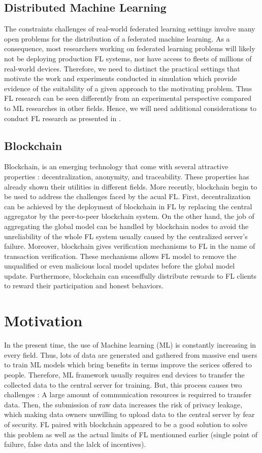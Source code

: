 \documentclass{article}
\begin{document}
\subsection{Distributed Machine Learning}
The constraints challenges of real-world federated learning settings involve many open problems for the distribution of a federated machine learning. As a consequence, most researchers working on federated learning problems will likely not be deploying production FL systems, nor have access to fleets of millions of real-world devices. Therefore, we need to distinct the practical settings that motivate the work and experiments conducted in simulation which provide evidence of the suitability of a given approach to the motivating problem. Thus FL research can be seen differently from an experimental perspective compared to ML researches in other fields. Hence,  we will need additional considerations to conduct FL research as presented in \cite{kairouz_advances_2021}.

\subsection{Blockchain}
Blockchain, is an emerging technology that come with several attractive properties : decentralization, anonymity, and traceability. These properties has already shown their utilities in different fields. More recently, blockchain begin to be used to address the challenges faced by the acual FL. First, decentralization can be achieved by the deployment of blockchain in FL by replacing the central aggregator by the peer-to-peer blockchain system. On the other hand,  the job of aggregating the global model can be handled by blockchain nodes to avoid the unreliability of the whole FL system usually caused by the centralized server's failure. Moreover, blockchain gives verification mechanisms to FL in the name of transaction verification. These mechanisms allows FL model to remove the unqualified or even malicious local model updates before the global model update. Furthermore, blockchain can sucessffully distribute rewards to FL clients to reward their participation and honest behaviors.

\section{Motivation}
In the present time, the use of Machine learning (ML) is constantly increasing in every field. Thus, lots of data are generated and gathered from massive end users to train ML models which bring benefits in terms improve the serices offered to people. Therefore, ML framework usually requires end devices to transfer the collected data to the central server for training. But, this process causes two challenges : A large amount of communication resources is requirred to transfer data. Then, the submission of raw data increases the risk of privacy leakage, which making data owners unwilling to upload data to the central server by fear of security. FL paired with blockchain appeared to be a good solution to solve this problem as well as the actual limits of FL mentionned earlier (single point of failure, false data and the lalck of incentives).
\end{document}
